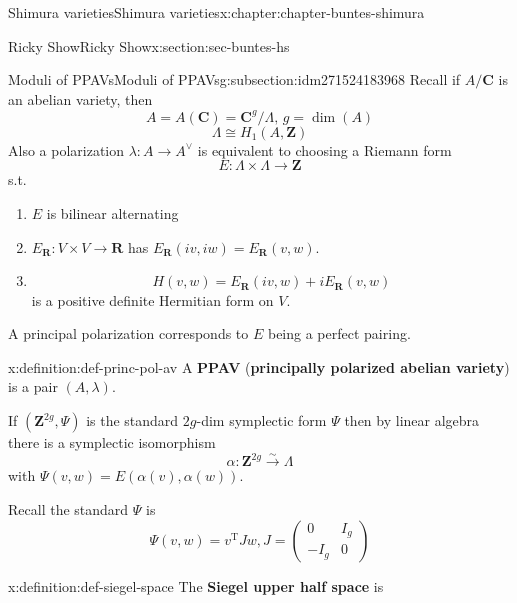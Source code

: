 \documentclass[oneside,10pt,]{book}
\newcommand{\terminology}[1]{\textbf{#1}}
\numberwithin{equation}{section}
\newcommand{\ZZ}{\mathbf{Z}}
\newcommand{\RR}{\mathbf{R}}
\newcommand{\CC}{\mathbf{C}}
\newcommand{\transpose}{\mathrm{T}}
\newcommand{\amp}{&}
\begin{document}
\begin{chapterptx}{Shimura varieties}{}{Shimura varieties}{}{}{x:chapter:chapter-buntes-shimura}
\begin{sectionptx}{Ricky Show}{}{Ricky Show}{}{}{x:section:sec-buntes-hs}
\typeout{************************************************}
%
\begin{subsectionptx}{Moduli of PPAVs}{}{Moduli of PPAVs}{}{}{g:subsection:idm271524183968}
Recall if \(A/ \CC\) is an abelian variety,  then%
\begin{equation*}
A = A(\CC) =  \CC^g/ \Lambda, \,g = \dim (A)
\end{equation*}
%
\begin{equation*}
\Lambda \cong H_1(A,\ZZ)
\end{equation*}
Also a polarization \(\lambda \colon A \to A^\vee\) is equivalent to choosing a Riemann form%
\begin{equation*}
E \colon \Lambda \times \Lambda \to \ZZ
\end{equation*}
s.t.%
\begin{enumerate}
\item{}\(E\) is bilinear alternating%
\item{}\(E_\RR \colon V\times V \to \RR\) has \(E_\RR(iv,iw)  = E_\RR( v,w)\).%
\item{}%
\begin{equation*}
H(v,w) = E_\RR(iv, w) + i E_\RR(v,w)
\end{equation*}
is a positive definite Hermitian form on \(V\).%
\end{enumerate}
A principal polarization corresponds to \(E\) being a perfect pairing.%
\begin{definition}{}{x:definition:def-princ-pol-av}%
A \terminology{PPAV} (\terminology{principally polarized abelian variety}) is a pair \((A,\lambda)\).%
\end{definition}
If \((\ZZ^{2g}, \Psi)\) is the standard \(2g\)-dim symplectic form \(\Psi\) then by linear algebra there is a symplectic isomorphism%
\begin{equation*}
\alpha \colon \ZZ^{2g} \xrightarrow\sim \Lambda
\end{equation*}
with \(\Psi(v,w) = E(\alpha(v), \alpha(w))\).%
\par
Recall the standard \(\Psi\) is%
\begin{equation*}
\Psi (v,w) = v^\transpose J w, J = \begin{pmatrix} 0 \amp I_g \\ -I_g \amp 0\end{pmatrix}
\end{equation*}
%
\begin{definition}{}{x:definition:def-siegel-space}%
The \terminology{Siegel upper half space} is%

\end{definition}
\end{subsectionptx}
\end{sectionptx}
\end{chapterptx}
\end{document}

